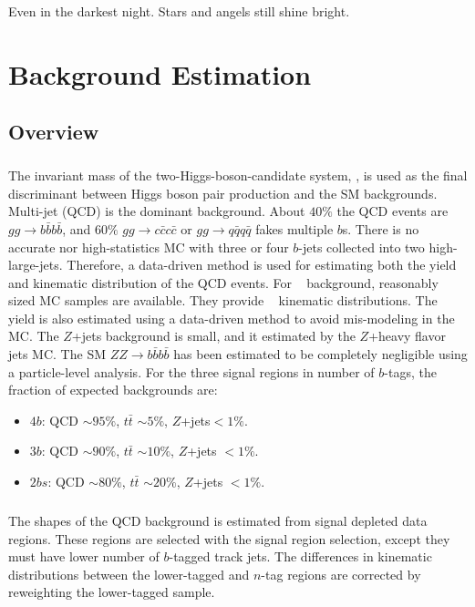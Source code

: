 \begin{savequote}[75mm]
Even in the darkest night. Stars and angels still shine bright.   
\end{savequote}


\chapter{Background Estimation}

\section{Overview}
\paragraph{}
The invariant mass of the two-Higgs-boson-candidate system, \mtwoJ, is used as the final discriminant between Higgs boson pair production and the SM backgrounds.
Multi-jet (QCD) is the dominant background.
About $40\%$ the QCD events are $gg \to b\bar{b}b\bar{b}$, and $60\%$ $gg \to c\bar{c}c\bar{c}$ or $gg \to q\bar{q}q\bar{q}$ fakes multiple $b$s.
There is no accurate nor high-statistics MC with three or four $b$-jets collected into two high-\pt~ large-\R jets.
Therefore, a data-driven method is used for estimating both the yield and kinematic distribution of the QCD events.
For \ttbar~ background, reasonably sized MC samples are available. 
They provide \ttbar~ kinematic distributions.
The \ttbar~ yield is also estimated using a data-driven method to avoid mis-modeling in the MC.
The $Z$+jets background is small, and it estimated by the $Z$+heavy flavor jets MC.
The SM $ZZ\to b\bar{b}b\bar{b}$ has been estimated to be completely negligible using a particle-level analysis.
For the three signal regions in number of $b$-tags, the fraction of expected backgrounds are:
\begin{itemize}
	\item $4b$: QCD $\sim 95\%$, $t\bar{t}$ $\sim 5\%$, $Z$+jets$< 1\%$. 
	\item $3b$: QCD $\sim 90\%$, $t\bar{t}$ $\sim 10\%$, $Z$+jets $< 1\%$.  
	\item $2bs$: QCD $\sim 80\%$, $t\bar{t}$ $\sim 20\%$, $Z$+jets $< 1\%$.
\end{itemize}

\paragraph{}
The shapes of the QCD background is estimated from signal depleted data regions. 
These regions are selected with the signal region selection, except they must have lower number of $b$-tagged track jets.
The differences in kinematic distributions between the lower-tagged and $n$-tag regions are corrected by reweighting the lower-tagged sample.

